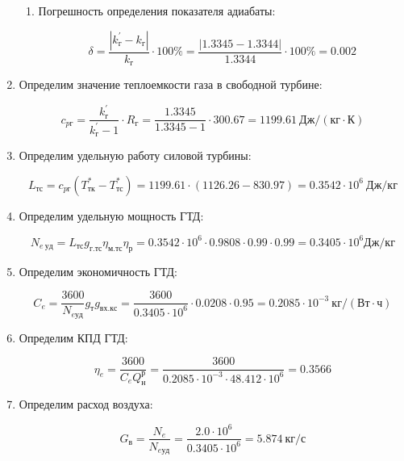 \documentclass[a4paper,10pt]{article}
\begin{document}
\begin{enumerate}
\begin{enumerate}
		\item Погрешность определения показателя адиабаты:
		
		\[
		\delta = \frac{ \left| k_{г}^\prime - k_{г} \right| }{ k_{г} } \cdot 100 \% =
				\frac{ \left|  1.3345 - 1.3344 \right| }{ 1.3344 } \cdot 100 \% =
				0.002
		\]
	
	\end{enumerate}
	
	\item Определим значение теплоемкости газа в свободной турбине:
	
	\[
	c_{pг} = \frac{ k_г^\prime }{ k_г^\prime - 1 } \cdot R_г = 
			\frac{ 1.3345 }{ 1.3345 - 1 } \cdot 300.67
			= 1199.61\ Дж/(кг \cdot К)
	\]
	
	\item Определим удельную работу силовой турбины:
	
	\[
	L_{тс} = c_{pг} ( T_{тк}^* -  T_{тс}^*) = 
		1199.61 \cdot ( 1126.26 -  830.97 ) = 
		0.3542 \cdot 10^6\ Дж/кг
	\]
	
	\item Определим удельную мощность ГТД:
	
	
	
	\[
	N_{e\ уд} = L_{тс} g_{г.тс} \eta_{м.тс} \eta_р = 
			0.3542 \cdot 10^6 \cdot 0.9808 \cdot 0.99 \cdot 0.99 =
	0.3405 \cdot 10^6 Дж/кг
	\]
	
	\item Определим экономичность ГТД:
	
	
	
	\[
	C_e = \frac{ 3600 }{ N_{e уд} } g_т g_{вх.кс} = 
			\frac{ 3600 }{ 0.3405 \cdot 10^6} \cdot 0.0208 \cdot 0.95 = 
	0.2085 \cdot 10^{-3}\ кг/\left( Вт \cdot ч \right)
	\]
	
	\item Определим КПД ГТД:
	
	\[
	\eta_e = \frac{ 3600 }{ C_e Q_н^р } = 
			\frac{ 3600 }{ 0.2085 \cdot 10^{-3} \cdot 48.412 \cdot 10^6} 
	= 0.3566
	\]
	
	\item Определим расход воздуха:
	
	\[
	G_в = \frac{N_e}{N_{e уд} } = 
	\frac{ 2.0 \cdot 10^6 }{ 0.3405 \cdot 10^6 } = 
	5.874\ кг/с
	\]

\end{enumerate}
\end{document}

